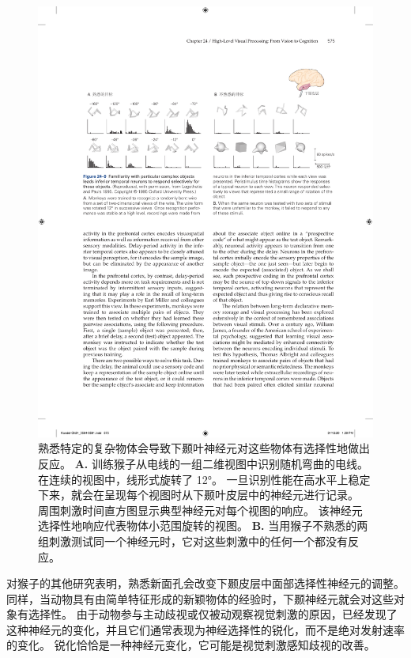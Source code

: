 \begin{figure}[htbp]
	\centering
	\includegraphics[width=1.0\linewidth]{chap24/fig_24_9}
	\caption{熟悉特定的复杂物体会导致下颞叶神经元对这些物体有选择性地做出反应。
		\textbf{A.} 训练猴子从电线的一组二维视图中识别随机弯曲的电线。 在连续的视图中，线形式旋转了 12°。
		一旦识别性能在高水平上稳定下来，就会在呈现每个视图时从下颞叶皮层中的神经元进行记录。
		周围刺激时间直方图显示典型神经元对每个视图的响应。
		该神经元选择性地响应代表物体小范围旋转的视图。
		\textbf{B.} 当用猴子不熟悉的两组刺激测试同一个神经元时，它对这些刺激中的任何一个都没有反应。}
	\label{fig:24_9}
\end{figure}


对猴子的其他研究表明，熟悉新面孔会改变下颞皮层中面部选择性神经元的调整。
同样，当动物具有由简单特征形成的新颖物体的经验时，下颞神经元就会对这些对象有选择性。
由于动物参与主动歧视或仅被动观察视觉刺激的原因，已经发现了这种神经元的变化，并且它们通常表现为神经选择性的锐化，而不是绝对发射速率的变化。
锐化恰恰是一种神经元变化，它可能是视觉刺激感知歧视的改善。



